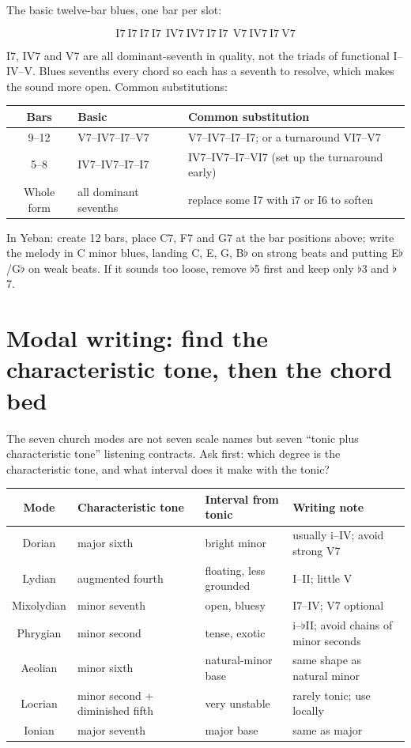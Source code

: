 The basic twelve-bar blues, one bar per slot:

\[
\mathrm{I7\ I7\ I7\ I7\ \ IV7\ IV7\ I7\ I7\ \ V7\ IV7\ I7\ V7}
\]

I7, IV7 and V7 are all dominant-seventh in quality, not the triads of functional I--IV--V. Blues sevenths every chord so each has a seventh to resolve, which makes the sound more open. Common substitutions:

\begin{center}
\small
\begin{tabular}{cll}
\toprule
Bars & Basic & Common substitution \\
\midrule
9--12 & V7--IV7--I7--V7 & V7--IV7--I7--I7; or a turnaround VI7--V7 \\
5--8 & IV7--IV7--I7--I7 & IV7--IV7--I7--VI7 (set up the turnaround early) \\
Whole form & all dominant sevenths & replace some I7 with i7 or I6 to soften \\
\bottomrule
\end{tabular}
\end{center}

In Yeban: create 12 bars, place C7, F7 and G7 at the bar positions above; write the melody in C minor blues, landing C, E, G, B\(\flat\) on strong beats and putting E\(\flat\)/G\(\flat\) on weak beats. If it sounds too loose, remove \(\flat\)5 first and keep only \(\flat\)3 and \(\flat\)7.

\section{Modal writing: find the characteristic tone, then the chord bed}

The seven church modes are not seven scale names but seven ``tonic plus characteristic tone'' listening contracts. Ask first: which degree is the characteristic tone, and what interval does it make with the tonic?

\begin{center}
\small
\begin{tabular}{clll}
\toprule
Mode & Characteristic tone & Interval from tonic & Writing note \\
\midrule
Dorian & major sixth & bright minor & usually i--IV; avoid strong V7 \\
Lydian & augmented fourth & floating, less grounded & I--II; little V \\
Mixolydian & minor seventh & open, bluesy & I7--IV; V7 optional \\
Phrygian & minor second & tense, exotic & i--\(\flat\)II; avoid chains of minor seconds \\
Aeolian & minor sixth & natural-minor base & same shape as natural minor \\
Locrian & minor second + diminished fifth & very unstable & rarely tonic; use locally \\
Ionian & major seventh & major base & same as major \\
\bottomrule
\end{tabular}
\end{center}

